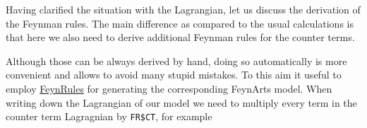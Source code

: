 \documentclass[../FeynCalcManual.tex]{subfiles}
\begin{document}
Having clarified the situation with the Lagrangian, let us discuss the
derivation of the Feynman rules. The main difference as compared to the
usual calculations is that here we also need to derive additional
Feynman rules for the counter terms.

Although those can be always derived by hand, doing so automatically is
more convenient and allows to avoid many stupid mistakes. To this aim it
useful to employ \href{https://feynrules.irmp.ucl.ac.be/}{FeynRules} for
generating the corresponding FeynArts model. When writing down the
Lagrangian of our model we need to multiply every term in the counter
term Lagragnian by \texttt{FR\$CT}, for example

\begin{Shaded}
\begin{Highlighting}[]
\ExtensionTok{=}\SpecialCharTok{+}

\ExtensionTok{=} \SpecialCharTok{/} \OperatorTok{[}\OperatorTok{,}\OperatorTok{]} \OperatorTok{[}\OperatorTok{,}\OperatorTok{]} \SpecialCharTok{{-}} \SpecialCharTok{/}\SpecialCharTok{\^{}}\SpecialCharTok{*}\SpecialCharTok{\^{}} \SpecialCharTok{{-}} \SpecialCharTok{/}\NormalTok{(}\NormalTok{!) }\SpecialCharTok{*}\SpecialCharTok{\^{}}\NormalTok{;}
\ExtensionTok{=}  \SpecialCharTok{/}\NormalTok{) }\OperatorTok{[}\OperatorTok{,}\OperatorTok{]} \OperatorTok{[}\OperatorTok{,}\OperatorTok{]} \SpecialCharTok{{-}} \SpecialCharTok{/}\SpecialCharTok{\^{}}\NormalTok{)}\SpecialCharTok{*}\SpecialCharTok{\^{}} \SpecialCharTok{{-}} \SpecialCharTok{/}\NormalTok{(}\SpecialCharTok{\^{}}\NormalTok{)}\SpecialCharTok{*}\SpecialCharTok{*}\SpecialCharTok{\^{}}\NormalTok{;}
\end{Highlighting}
\end{Shaded}
\end{document}
